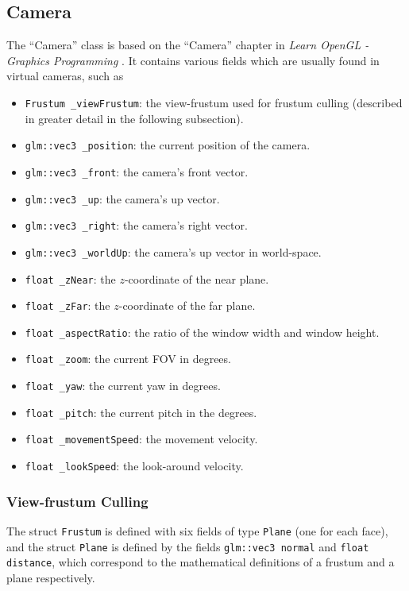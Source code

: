 \subsection{Camera}
The ``Camera'' class is based on the ``Camera'' chapter in \textit{Learn OpenGL - Graphics Programming} \cite{learnopengl}.
It contains various fields which are usually found in virtual cameras, such as 
\begin{itemize}
  \item \texttt{Frustum \_viewFrustum}: the view-frustum used for frustum culling (described in greater detail in the following subsection).
  \item \texttt{glm::vec3 \_position}: the current position of the camera.
  \item \texttt{glm::vec3 \_front}: the camera's front vector.
  \item \texttt{glm::vec3 \_up}: the camera's up vector.
  \item \texttt{glm::vec3 \_right}: the camera's right vector.
  \item \texttt{glm::vec3 \_worldUp}: the camera's up vector in world-space.
  \item \texttt{float \_zNear}: the $z$-coordinate of the near plane.
  \item \texttt{float \_zFar}: the $z$-coordinate of the far plane.
  \item \texttt{float \_aspectRatio}: the ratio of the window width and window height.
  \item \texttt{float \_zoom}: the current FOV in degrees.
  \item \texttt{float \_yaw}: the current yaw in degrees.
  \item \texttt{float \_pitch}: the current pitch in the degrees.
  \item \texttt{float \_movementSpeed}: the movement velocity.
  \item \texttt{float \_lookSpeed}: the look-around velocity.
\end{itemize}

\subsubsection{View-frustum Culling}
The struct \texttt{Frustum} is defined with six fields of type \texttt{Plane} (one for each face), and the struct \texttt{Plane}
is defined by the fields \texttt{glm::vec3 normal} and \texttt{float distance}, which correspond to the mathematical definitions 
of a frustum and a plane respectively.

